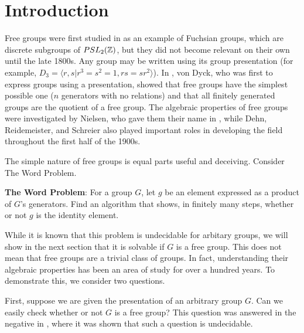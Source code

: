 \section*{Introduction}

Free groups were first studied in \cite{Fuchs1980} as an example of Fuchsian groups, which are discrete subgroups of $PSL_2(\mathbb{Z})$, but they did not become relevant on their own until the late 1800s. Any group may be written using its group presentation (for example, $D_3 = \langle r,s | r^3 = s^2 = 1, rs = sr^2 \rangle$). In \cite{Dyck1882}, von Dyck, who was first to express groups using a presentation, showed that free groups have the simplest possible one ($n$ generators with no relations) and that all finitely generated groups are the quotient of a free group. The algebraic properties of free groups were investigated by Nielsen, who gave them their name in \cite{Nielsen1924}, while Dehn, Reidemeister, and Schreier also played important roles in developing the field throughout the first half of the 1900s. 

The simple nature of free groups is equal parts useful and deceiving. Consider The Word Problem. 

\vspace{0.5cm}

\begin{center}
    \begin{minipage}{0.7\textwidth}
        \textbf{The Word Problem}: For a group $G$, let $g$ be an element expressed as a product of $G$'s generators. Find an algorithm that shows, in finitely many steps, whether or not $g$ is the identity element.
    \end{minipage}
\end{center}

\vspace{0.5cm}

While it is known that this problem is undecidable for arbitary groups, we will show in the next section that it is solvable if $G$ is a free group. This does not mean that free groups are a trivial class of groups. In fact, understanding their algebraic properties has been an area of study for over a hundred years. To demonstrate this, we consider two questions.

First, suppose we are given the presentation of an arbitrary group $G$. Can we easily check whether or not $G$ is a free group? This question was answered in the negative in \cite{Adyan1955,Rabin1958}, where it was shown that such a question is undecidable. 

